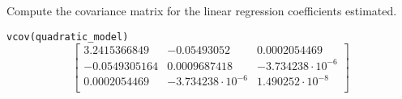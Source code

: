 Compute the covariance matrix for the linear regression coefficients estimated.

\soln*
\texttt{vcov(quadratic\_model)}
$$
\begin{bmatrix}
	3.2415366849 & -0.05493052 & 0.0002054469\\
	-0.0549305164 & 0.0009687418 & -3.734238 \cdot 10^{-6} \\
    0.0002054469 & -3.734238 \cdot 10^{-6} & 1.490252 \cdot 10^{-8}\\
\end{bmatrix}$$
